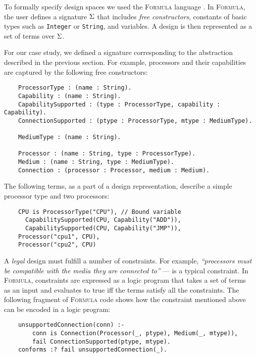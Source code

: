 \documentclass[conference]{IEEEtran}
\newcommand{\FORMULA}{\textsc{Formula}}
\begin{document}
To formally specify design spaces we used the \FORMULA{} language \cite{??}. In \FORMULA{}, the user defines a signature $\Sigma$ that includes \emph{free constructors}, constants of basic types such as \texttt{Integer} or \texttt{String}, and variables. A design is then represented as a set of terms over $\Sigma$. 

For our case study, we defined a signature corresponding to the abstraction described in the previous section. For example, processors and their capabilities are captured by the following free constructors:

{\scriptsize\begin{verbatim}
    ProcessorType : (name : String).    
    Capability : (name : String).
    CapabilitySupported : (type : ProcessorType, capability : Capability).    
    ConnectionSupported : (ptype : ProcessorType, mtype : MediumType).
    
    MediumType : (name : String).

    Processor : (name : String, type : ProcessorType).
    Medium : (name : String, type : MediumType).    
    Connection : (processor : Processor, medium : Medium).
\end{verbatim}}

The following terms, as a part of a design representation, describe a simple processor type and two processors:    

{\scriptsize\begin{verbatim}
    CPU is ProcessorType("CPU"), // Bound variable
      CapabilitySupported(CPU, Capability("ADD")),
      CapabilitySupported(CPU, Capability("JMP")),
    Processor("cpu1", CPU),
    Processor("cpu2", CPU)
\end{verbatim}}

A \emph{legal} design must fulfill a number of constraints. For example, 
\emph{``processors must be compatible with the media they are connected to''} --- is a typical constraint.
In \FORMULA{}, constraints are expressed as a logic program that takes a set of terms as an input and evaluates to true iff the terms satisfy all the constraints. The following fragment of \FORMULA{} code shows how the constraint mentioned above can be encoded in a logic program:

{\scriptsize\begin{verbatim}
    unsupportedConnection(conn) :- 
        conn is Connection(Processor(_, ptype), Medium(_, mtype)), 
        fail ConnectionSupported(ptype, mtype).
    conforms :? fail unsupportedConnection(_).
\end{verbatim}}
\end{document}
